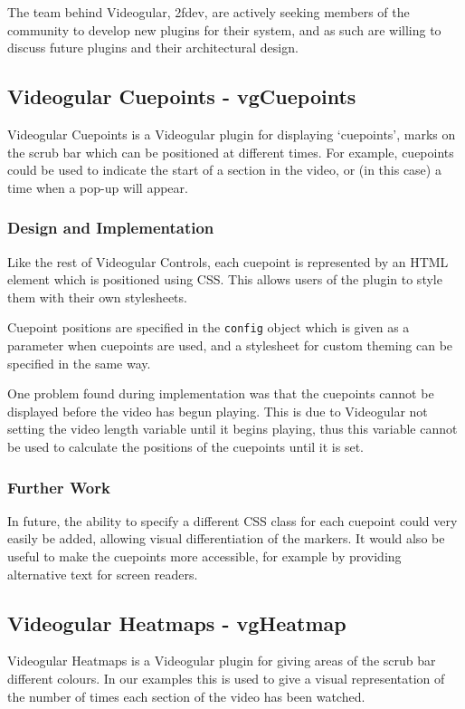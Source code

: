 The team behind \gls{Videogular}, 2fdev, are actively seeking members of the community to develop new plugins for their system, and as such are willing to discuss future plugins and their architectural design.

\subsection{Videogular Cuepoints - vgCuepoints}
\label{Subsection:vgCuepoints}
\gls{Videogular} Cuepoints is a \gls{Videogular} plugin for displaying `cuepoints', marks on the scrub bar which can be positioned at different times. For example, cuepoints could be used to indicate the start of a section in the video, or (in this case) a time when a pop-up will appear.

\subsubsection{Design and Implementation}
Like the rest of Videogular Controls, each cuepoint is represented by an HTML element which is positioned using \gls{CSS}. This allows users of the plugin to style them with their own stylesheets.

Cuepoint positions are specified in the \texttt{config} object which is given as a parameter when cuepoints are used, and a stylesheet for custom theming can be specified in the same way.

One problem found during implementation was that the cuepoints cannot be displayed before the video has begun playing. This is due to \gls{Videogular} not setting the video length variable until it begins playing, thus this variable cannot be used to calculate the positions of the cuepoints until it is set.

\subsubsection{Further Work}
In future, the ability to specify a different \gls{CSS} class for each cuepoint could very easily be added, allowing visual differentiation of the markers. It would also be useful to make the cuepoints more accessible, for example by providing alternative text for screen readers.


\subsection{Videogular Heatmaps - vgHeatmap}
\gls{Videogular} Heatmaps is a \gls{Videogular} plugin for giving areas of the scrub bar different colours. In our examples this is used to give a visual representation of the number of times each section of the video has been watched.

